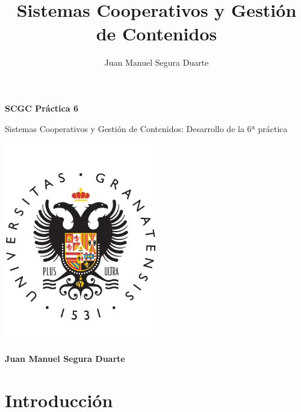 \documentclass[a4paper]{article}
\title{Sistemas Cooperativos y Gestión de Contenidos}
\author{Juan Manuel Segura Duarte}
\begin{document}
\begin{titlepage}
    \centering
    \vspace*{3cm}  %
    {\Huge \textbf{SCGC Práctica 6}} %
    \vspace{1cm}
    
    {\Large Sistemas Cooperativos y Gestión de Contenidos: Desarrollo de la 6ª práctica} %
    
    \includegraphics[width=0.5\textwidth]{images/ugr-logo.png}
    \vspace{1cm}
    
    \textbf{\Large Juan Manuel Segura Duarte} %
\end{titlepage}
\newpage

\thispagestyle{empty}
\tableofcontents


\newpage
{}
\setcounter{page}{1}


\section{Introducción}
\end{document}

